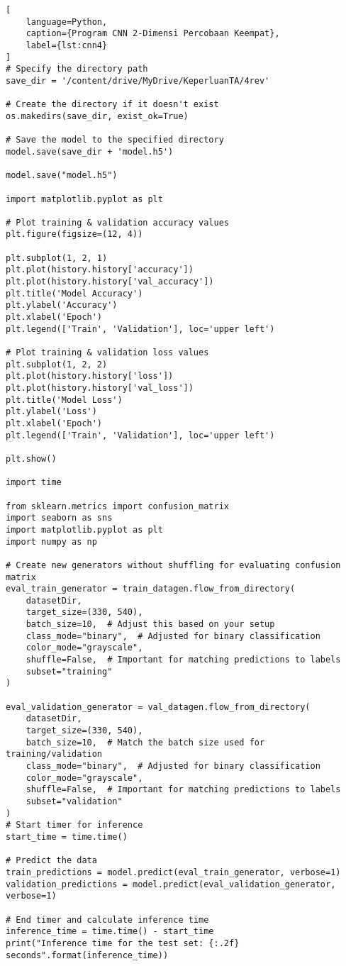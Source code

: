 \begin{lstlisting}[
    language=Python,
    caption={Program CNN 2-Dimensi Percobaan Keempat},
    label={lst:cnn4}
]
# Specify the directory path
save_dir = '/content/drive/MyDrive/KeperluanTA/4rev'

# Create the directory if it doesn't exist
os.makedirs(save_dir, exist_ok=True)

# Save the model to the specified directory
model.save(save_dir + 'model.h5')

model.save("model.h5")

import matplotlib.pyplot as plt

# Plot training & validation accuracy values
plt.figure(figsize=(12, 4))

plt.subplot(1, 2, 1)
plt.plot(history.history['accuracy'])
plt.plot(history.history['val_accuracy'])
plt.title('Model Accuracy')
plt.ylabel('Accuracy')
plt.xlabel('Epoch')
plt.legend(['Train', 'Validation'], loc='upper left')

# Plot training & validation loss values
plt.subplot(1, 2, 2)
plt.plot(history.history['loss'])
plt.plot(history.history['val_loss'])
plt.title('Model Loss')
plt.ylabel('Loss')
plt.xlabel('Epoch')
plt.legend(['Train', 'Validation'], loc='upper left')

plt.show()

import time

from sklearn.metrics import confusion_matrix
import seaborn as sns
import matplotlib.pyplot as plt
import numpy as np

# Create new generators without shuffling for evaluating confusion matrix
eval_train_generator = train_datagen.flow_from_directory(
    datasetDir,
    target_size=(330, 540),
    batch_size=10,  # Adjust this based on your setup
    class_mode="binary",  # Adjusted for binary classification
    color_mode="grayscale",
    shuffle=False,  # Important for matching predictions to labels
    subset="training"
)

eval_validation_generator = val_datagen.flow_from_directory(
    datasetDir,
    target_size=(330, 540),
    batch_size=10,  # Match the batch size used for training/validation
    class_mode="binary",  # Adjusted for binary classification
    color_mode="grayscale",
    shuffle=False,  # Important for matching predictions to labels
    subset="validation"
)
# Start timer for inference
start_time = time.time()

# Predict the data
train_predictions = model.predict(eval_train_generator, verbose=1)
validation_predictions = model.predict(eval_validation_generator, verbose=1)

# End timer and calculate inference time
inference_time = time.time() - start_time
print("Inference time for the test set: {:.2f} seconds".format(inference_time))


\end{lstlisting}
